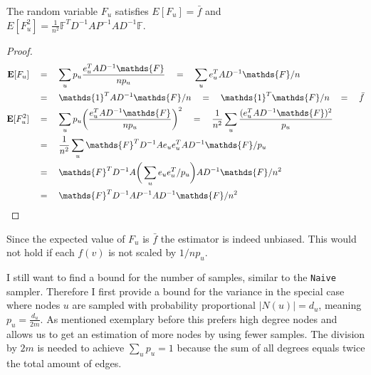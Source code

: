 \begin{lemma}
\label{lemmafu}
  The random variable $F_u$ satisfies $E[F_u] = \bar{f}$ and \\
  $E[F_u^2] = \frac{1}{n^2}\mathds{F}^TD^{-1}AP^{-1}AD^{-1}\mathds{F}$.
\end{lemma}
\begin{proof}
\begin{align*}
\textbf{E}[F_u] \quad&=\quad \sum_u p_u \frac{e_u^TAD^{-1}\mathds{F}}{np_u} \quad=\quad \sum_u e_u^TAD^{-1}\mathds{F}/n \\
&=\quad\mathds{1}^TAD^{-1}\mathds{F}/n \quad=\quad \mathds{1}^T\mathds{F}/n \quad=\quad \bar{f} \\
\textbf{E}[F_u^2] \quad&=\quad \sum_u p_u \bigg(\frac{e_u^TAD^{-1}\mathds{F}}{np_u}\bigg)^2 \quad=\quad \frac{1}{n^2}\sum_u \frac{(e_u^TAD^{-1}\mathds{F})^2}{p_u} \\
&=\quad\frac{1}{n^2}\sum_u \mathds{F}^TD^{-1}Ae_ue_u^TAD^{-1}\mathds{F}/p_u \\
&=\quad \mathds{F}^TD^{-1}A\bigg(\sum_ue_ue_u^T/p_u\bigg)AD^{-1}\mathds{F}/n^2 \\
&=\quad \mathds{F}^TD^{-1}AP^{-1}AD^{-1}\mathds{F}/n^2 \qedhere
\end{align*}
\end{proof}
Since the expected value of $F_u$ is $\bar{f}$ the estimator is indeed unbiased.
This would not hold if each $f(v)$ is not scaled by $1/{np_u}$.

I still want to find a bound for the number of samples, similar to the \texttt{Naive} sampler.
Therefore I first provide a bound for the variance in the special case where nodes $u$ are sampled with probability proportional $|N(u)| = d_u$, meaning $p_u = \frac{d_u}{2m}$. As mentioned exemplary before this prefers high degree nodes and allows us to get an estimation of more nodes by using fewer samples. The division by $2m$ is needed to achieve $\sum_u{p_u} = 1$ because the sum of all degrees equals twice the total amount of edges.

